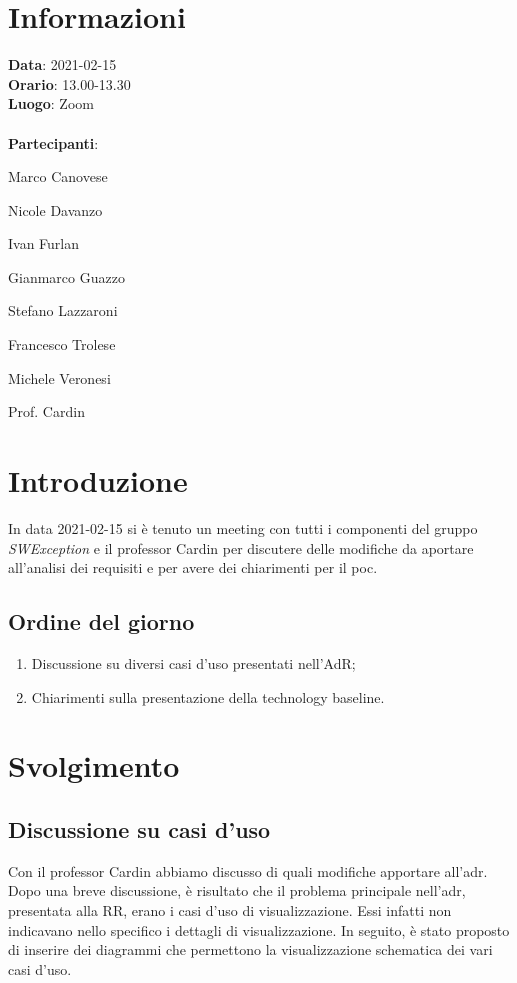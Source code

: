 \section{Informazioni}
\textbf{Data}: 2021-02-15\\
\textbf{Orario}: 13.00-13.30\\
\textbf{Luogo}: Zoom\\\\
\textbf{Partecipanti}:\begin{list}{*}{\setlength{\itemsep}{0cm}}
	\item Marco Canovese
	\item Nicole Davanzo
	\item Ivan Furlan
	\item Gianmarco Guazzo
	\item Stefano Lazzaroni
	\item Francesco Trolese
	\item Michele Veronesi
	\item Prof. Cardin
\end{list}

\section{Introduzione}
In data 2021-02-15 si è tenuto un meeting con tutti i componenti del gruppo \textit{SWException} e il professor Cardin per discutere delle modifiche da aportare all'analisi dei requisiti e per avere dei chiarimenti per il poc. \\

\subsection{Ordine del giorno}
\begin{enumerate}
    \item Discussione su diversi casi d'uso presentati nell'AdR;
    \item Chiarimenti sulla presentazione della technology baseline.
\end{enumerate}

\section{Svolgimento}

\subsection{Discussione su casi d'uso}
Con il professor Cardin abbiamo discusso di quali modifiche apportare all'adr. Dopo una breve discussione, è risultato che il problema principale nell'adr, presentata alla RR, erano i casi d'uso di visualizzazione. 
Essi infatti non indicavano nello specifico i dettagli di visualizzazione.
In seguito, è stato proposto di inserire dei diagrammi che permettono la visualizzazione schematica dei vari casi d'uso.

